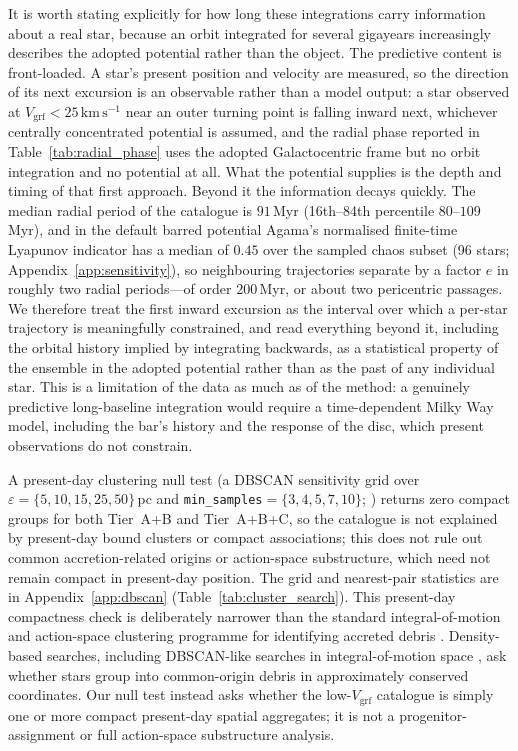 \documentclass{aa}  %
\newcommand{\vgrf}{\ensuremath{V_{\mathrm{grf}}}\xspace}
\newcommand{\kms}{\ensuremath{\,\mathrm{km\,s^{-1}}}\xspace}
\begin{document}
It is worth stating explicitly for how long these integrations carry
information about a real star, because an orbit integrated for several
gigayears increasingly describes the adopted potential rather than the
object.  The predictive content is front-loaded.  A star's present
position and velocity are measured, so the direction of its next
excursion is an observable rather than a model output: a star observed at
$\vgrf<25\kms$ near an outer turning point is falling inward next,
whichever centrally concentrated potential is assumed, and the radial
phase reported in Table~\ref{tab:radial_phase} uses the adopted
Galactocentric frame but no orbit integration and no potential at all.
What the potential supplies is the
depth and timing of that first approach.  Beyond it the information
decays quickly.  The median radial period of the catalogue is $91$\,Myr
(16th--84th percentile $80$--$109$\,Myr), and in the default barred
potential Agama's normalised finite-time Lyapunov indicator has a median
of $0.45$ over the sampled chaos subset (96 stars;
Appendix~\ref{app:sensitivity}), so neighbouring trajectories separate by
a factor $e$ in roughly two radial periods---of order $200$\,Myr, or
about two pericentric passages.  We therefore treat the first inward
excursion as the interval over which a per-star trajectory is
meaningfully constrained, and read everything beyond it, including the
orbital history implied by integrating backwards, as a statistical
property of the ensemble in the adopted potential rather than as the
past of any individual star.  This is a limitation of the data as much as
of the method: a genuinely predictive long-baseline integration would
require a time-dependent Milky Way model, including the bar's history and
the response of the disc, which present observations do not constrain.

A present-day clustering null test (a DBSCAN sensitivity grid over
$\varepsilon=\{5,10,15,25,50\}$\,pc and
\texttt{min\_samples}$=\{3,4,5,7,10\}$;
\citealt{Ester1996,Schubert2017}) returns zero compact groups for both
Tier~A+B and Tier~A+B+C, so the catalogue is not explained by present-day
bound clusters or compact associations; this does not rule out common
accretion-related origins or action-space substructure, which need not
remain compact in present-day position. The grid and nearest-pair
statistics are in Appendix~\ref{app:dbscan} (Table~\ref{tab:cluster_search}).
This present-day compactness check is deliberately narrower than the
standard integral-of-motion and action-space clustering programme for
identifying accreted debris
\citep{HelmiDeZeeuw2000,Myeong2018Streams,Myeong2018Shards,
Koppelman2019,Lovdal2022,RuizLara2022,Dodd2023}.  Density-based
searches, including DBSCAN-like searches in integral-of-motion space
\citep{Borsato2020}, ask whether stars group into common-origin debris
in approximately conserved coordinates.  Our null test instead asks
whether the low-\vgrf{} catalogue is simply one or more compact
present-day spatial aggregates; it is not a progenitor-assignment or
full action-space substructure analysis.
\end{document}
